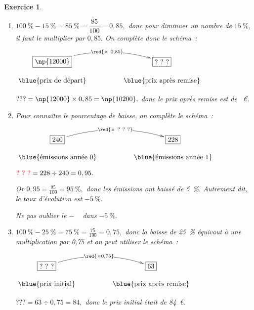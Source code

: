 \documentclass[10pt]{article}
\newtheorem{exo}{Exercice}
\begin{document}
\begin{exo}

\begin{enumerate}
\item $100~\%-15~\%=85~\%=\dfrac{85}{100}=0,85,$ donc pour diminuer un nombre de $15~\%,$ il faut le multiplier par $0,85.$ On complète donc le schéma~:

\begin{center}
$\xymatrix@R=0.5pc@C=4pc{
    *+[F]+\txt{\np{12000}} \ar@/^0.5cm/[r]|{\red{\times ~0,85}} & 
    *+[F]+\txt{?~?~?}  \\
    \txt{\blue{prix de départ}}&
    \txt{\blue{prix après remise}}}$
    
    \end{center}
    
    \medskip
    
$???=\np{12000}\times 0,85=\np{10200},$ donc le prix après remise est de ~\euro. 

\item Pour connaître le pourcentage de baisse, on complète le schéma~:

\begin{center}
$\xymatrix@R=0.5pc@C=4pc{
    *+[F]+\txt{240} \ar@/^0.5cm/[r]|{\red{\times ~?~?~?}} & 
    *+[F]+\txt{228}  \\
    \txt{\blue{émissions année 0}}&
    \txt{\blue{émissions année 1}}}$
    
    \end{center}
    
    \medskip
    
$\textcolor{red}{\text{?~?~?}}=228\div 240=0,95.$

Or $0,95=\frac{95}{100}=95~\%,$ donc les émissions ont baissé de 5~\%. Autrement dit, le taux d'évolution est $-5~\%.$

\medskip

\danger Ne pas oublier le \og $-$ \fg~{} dans $-5~\%.$



\item $100~\%-25~\%=75~\%=\frac{75}{100}=0,75,$ donc la baisse de 25~\% équivaut à une multiplication par 0,75 et on peut utiliser le schéma~:

\begin{center}
$\xymatrix@R=0.5pc@C=4pc{
    *+[F]+\txt{?~?~?} \ar@/^0.5cm/[r]|{\red{\times 0,75}} & 
    *+[F]+\txt{63}  \\
    \txt{\blue{prix initial}}&
    \txt{\blue{prix après remise}}}$
    
    \end{center}
    
    \medskip

$???=63\div 0,75=84,$ donc le prix initial était de 84~\euro.

\end{enumerate}

\end{exo}
\end{document}
